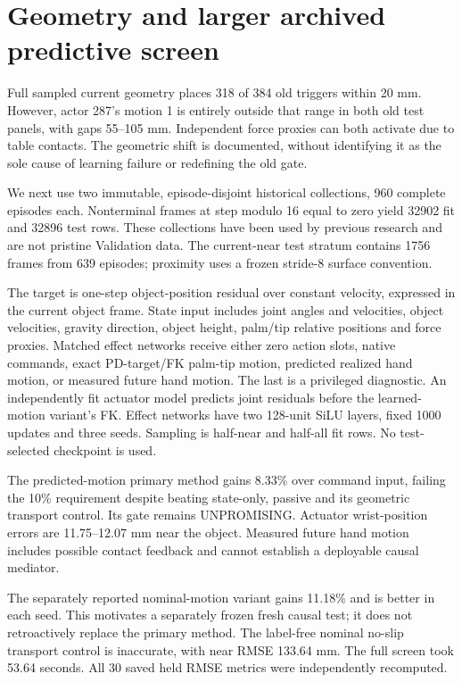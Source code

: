 \documentclass[10pt]{article}
\begin{document}
\section{Geometry and larger archived predictive screen}
Full sampled current geometry places 318 of 384 old triggers within 20 mm. However,
actor 287's motion 1 is entirely outside that range in both old test panels, with
gaps 55--105 mm. Independent force proxies can both activate due to table contacts.
The geometric shift is documented, without identifying it as the sole cause of
learning failure or redefining the old gate.

We next use two immutable, episode-disjoint historical collections, 960 complete
episodes each. Nonterminal frames at step modulo 16 equal to zero yield 32902 fit
and 32896 test rows. These collections have been used by previous research and are
not pristine Validation data. The current-near test stratum contains 1756 frames
from 639 episodes; proximity uses a frozen stride-8 surface convention.

The target is one-step object-position residual over constant velocity, expressed
in the current object frame. State input includes joint angles and velocities,
object velocities, gravity direction, object height, palm/tip relative positions
and force proxies. Matched effect networks receive either zero action slots, native
commands, exact PD-target/FK palm-tip motion, predicted realized hand motion, or
measured future hand motion. The last is a privileged diagnostic. An independently
fit actuator model predicts joint residuals before the learned-motion variant's FK.
Effect networks have two 128-unit SiLU layers, fixed 1000 updates and three seeds.
Sampling is half-near and half-all fit rows. No test-selected checkpoint is used.

\begin{table}[h]
\centering

\caption{Archived one-step vector prediction error, seed-mean millimeters. Near and all-state strata differ.}
\end{table}

The predicted-motion primary method gains 8.33\% over command input, failing the
10\% requirement despite beating state-only, passive and its geometric transport
control. Its gate remains UNPROMISING. Actuator wrist-position errors are
11.75--12.07 mm near the object. Measured future hand motion includes possible
contact feedback and cannot establish a deployable causal mediator.

The separately reported nominal-motion variant gains 11.18\% and is better in each
seed. This motivates a separately frozen fresh causal test; it does not retroactively
replace the primary method. The label-free nominal no-slip transport control is
inaccurate, with near RMSE 133.64 mm. The full screen took 53.64 seconds. All 30
saved held RMSE metrics were independently recomputed.
\end{document}
